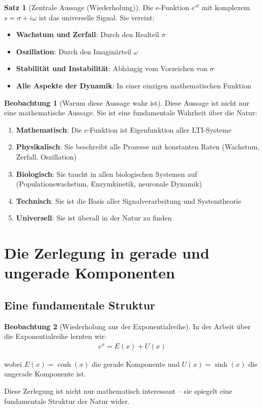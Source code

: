 ﻿\documentclass[a4paper,12pt]{report}
\theoremstyle{definition}
\newtheorem{satz}{Satz}
\newtheorem{beobachtung}{Beobachtung}
\begin{document}
	\begin{satz}[Zentrale Aussage (Wiederholung)]
		Die e-Funktion $e^{st}$ mit komplexem $s = \sigma + i\omega$ ist das universelle Signal. Sie vereint:
		\begin{itemize}
			\item[-] \textbf{Wachstum und Zerfall}: Durch den Realteil $\sigma$
			\item[-] \textbf{Oszillation}: Durch den Imaginärteil $\omega$
			\item[-] \textbf{Stabilität und Instabilität}: Abhängig vom Vorzeichen von $\sigma$
			\item[-] \textbf{Alle Aspekte der Dynamik}: In einer einzigen mathematischen Funktion
		\end{itemize}
	\end{satz}
	
	\begin{beobachtung}[Warum diese Aussage wahr ist]
		Diese Aussage ist nicht nur eine mathematische Aussage. Sie ist eine fundamentale Wahrheit über die Natur:
		
		\begin{enumerate}
			\item[-] \textbf{Mathematisch}: Die e-Funktion ist Eigenfunktion aller LTI-Systeme
			\item[-] \textbf{Physikalisch}: Sie beschreibt alle Prozesse mit konstanten Raten (Wachstum, Zerfall, Oszillation)
			\item[-] \textbf{Biologisch}: Sie taucht in allen biologischen Systemen auf (Populationswachstum, Enzymkinetik, neuronale Dynamik)
			\item[-] \textbf{Technisch}: Sie ist die Basis aller Signalverarbeitung und Systemtheorie
			\item[-] \textbf{Universell}: Sie ist überall in der Natur zu finden
		\end{enumerate}
	\end{beobachtung}
	
	\section{Die Zerlegung in gerade und ungerade Komponenten}
	
	\subsection{Eine fundamentale Struktur}
	
	\begin{beobachtung}[Wiederholung aus der Exponentialreihe]
		In der Arbeit über die Exponentialreihe lernten wir:
		\begin{align}
			e^x = E(x) + U(x)
		\end{align}
		
		wobei $E(x) = \cosh(x)$ die gerade Komponente und $U(x) = \sinh(x)$ die ungerade Komponente ist.
		
		Diese Zerlegung ist nicht nur mathematisch interessant -- sie spiegelt eine fundamentale Struktur der Natur wider.
	\end{beobachtung}
	
\end{document}

